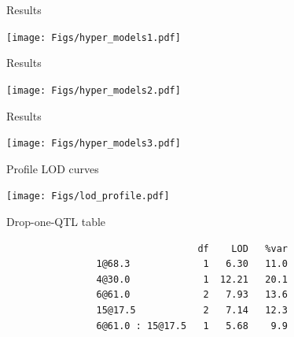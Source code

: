 \documentclass[12pt]{article}
\newcommand{\headsize}{\fontsize{35}{35} \selectfont}
\newcommand{\smallersize}{\fontsize{20}{25} \selectfont}
\begin{document}
\newpage

\headsize \color{myyellow}
\hfill \begin{minipage}{5.75in}
\centering
Results
\end{minipage}

\vfill


\centerline{\texttt{[image: Figs/hyper\_models1.pdf]}}



\newpage

\addtocounter{page}{-1}

\headsize \color{myyellow}
\hfill \begin{minipage}{5.75in}
\centering
Results
\end{minipage}

\vfill


\centerline{\texttt{[image: Figs/hyper\_models2.pdf]}}



\newpage

\addtocounter{page}{-1}

\headsize \color{myyellow}
\hfill \begin{minipage}{5.75in}
\centering
Results
\end{minipage}

\vfill


\centerline{\texttt{[image: Figs/hyper\_models3.pdf]}}


\newpage

\headsize \color{myyellow}
\hfill \begin{minipage}{5.75in}
\centering
Profile LOD curves
\end{minipage}

\vfill


\centerline{\texttt{[image: Figs/lod\_profile.pdf]}}


\newpage

\headsize \color{myyellow}
\hfill \begin{minipage}{5.75in}
\centering
Drop-one-QTL table
\end{minipage}


\vspace{40mm}

\color{mywhite} \smallersize

\begin{verbatim}
                                  df    LOD   %var
                1@68.3             1   6.30   11.0
                4@30.0             1  12.21   20.1
                6@61.0             2   7.93   13.6
                15@17.5            2   7.14   12.3
                6@61.0 : 15@17.5   1   5.68    9.9
\end{verbatim}
\end{document}
